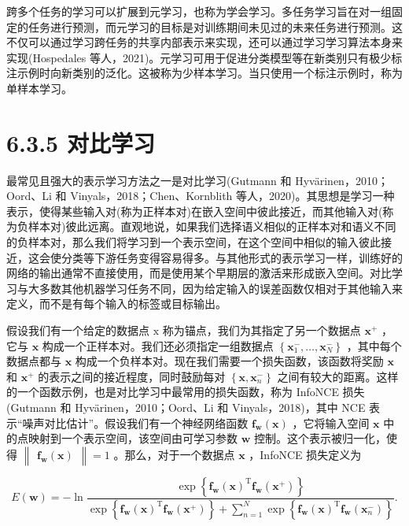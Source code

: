 \documentclass[10pt]{article}
\begin{document}
跨多个任务的学习可以扩展到元学习，也称为学会学习。多任务学习旨在对一组固定的任务进行预测，而元学习的目标是对训练期间未见过的未来任务进行预测。这不仅可以通过学习跨任务的共享内部表示来实现，还可以通过学习学习算法本身来实现(Hospedales 等人，2021)。元学习可用于促进分类模型等在新类别只有极少标注示例时向新类别的泛化。这被称为少样本学习。当只使用一个标注示例时，称为单样本学习。

\section*{6.3.5 对比学习}

最常见且强大的表示学习方法之一是对比学习(Gutmann 和 Hyvärinen，2010；Oord、Li 和 Vinyals，2018；Chen、Kornblith 等人，2020)。其思想是学习一种表示，使得某些输入对(称为正样本对)在嵌入空间中彼此接近，而其他输入对(称为负样本对)彼此远离。直观地说，如果我们选择语义相似的正样本对和语义不同的负样本对，那么我们将学习到一个表示空间，在这个空间中相似的输入彼此接近，这会使分类等下游任务变得容易得多。与其他形式的表示学习一样，训练好的网络的输出通常不直接使用，而是使用某个早期层的激活来形成嵌入空间。对比学习与大多数其他机器学习任务不同，因为给定输入的误差函数仅相对于其他输入来定义，而不是有每个输入的标签或目标输出。

假设我们有一个给定的数据点 \(\mathrm{x}\) 称为锚点，我们为其指定了另一个数据点 \({\mathbf{x}}^{ + }\) ，它与 \(\mathbf{x}\) 构成一个正样本对。我们还必须指定一组数据点 \(\left\{  {{\mathbf{x}}_{1}^{ - },\ldots ,{\mathbf{x}}_{N}^{ - }}\right\}\) ，其中每个数据点都与 \(\mathbf{x}\) 构成一个负样本对。现在我们需要一个损失函数，该函数将奖励 \(\mathbf{x}\) 和 \({\mathbf{x}}^{ + }\) 的表示之间的接近程度，同时鼓励每对 \(\left\{  {\mathbf{x},{\mathbf{x}}_{n}^{ - }}\right\}\) 之间有较大的距离。这样的一个函数示例，也是对比学习中最常用的损失函数，称为 InfoNCE 损失(Gutmann 和 Hyvärinen，2010；Oord、Li 和 Vinyals，2018)，其中 NCE 表示“噪声对比估计”。假设我们有一个神经网络函数 \({\mathbf{f}}_{\mathbf{w}}\left( \mathbf{x}\right)\) ，它将输入空间 \(\mathbf{x}\) 中的点映射到一个表示空间，该空间由可学习参数 \(\mathbf{w}\) 控制。这个表示被归一化，使得 \(\begin{Vmatrix}{{\mathbf{f}}_{\mathbf{w}}\left( \mathbf{x}\right) }\end{Vmatrix} = 1\) 。那么，对于一个数据点 \(\mathbf{x}\) ，InfoNCE 损失定义为

\[
E\left( \mathbf{w}\right)  =  - \ln \frac{\exp \left\{  {{\mathbf{f}}_{\mathbf{w}}{\left( \mathbf{x}\right) }^{\mathrm{T}}{\mathbf{f}}_{\mathbf{w}}\left( {\mathbf{x}}^{ + }\right) }\right\}  }{\exp \left\{  {{\mathbf{f}}_{\mathbf{w}}{\left( \mathbf{x}\right) }^{\mathrm{T}}{\mathbf{f}}_{\mathbf{w}}\left( {\mathbf{x}}^{ + }\right) }\right\}   + \mathop{\sum }\limits_{{n = 1}}^{N}\exp \left\{  {{\mathbf{f}}_{\mathbf{w}}{\left( \mathbf{x}\right) }^{\mathrm{T}}{\mathbf{f}}_{\mathbf{w}}\left( {\mathbf{x}}_{n}^{ - }\right) }\right\}  }. \tag{6.20}
\]
\end{document}
